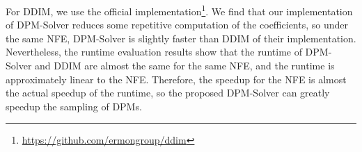 For DDIM, we use the official implementation\footnote{\url{https://github.com/ermongroup/ddim}}. We find that our implementation of DPM-Solver reduces some repetitive computation of the coefficients, so under the same NFE, DPM-Solver is slightly faster than DDIM of their implementation. Nevertheless, the runtime evaluation results show that the runtime of DPM-Solver and DDIM are almost the same for the same NFE, and the runtime is approximately linear to the NFE. Therefore, the speedup for the NFE is almost the actual speedup of the runtime, so the proposed DPM-Solver can greatly speedup the sampling of DPMs.


\begin{table}[t]
    \centering
    \caption{\small{Runtime of a single batch (second / batch, $\pm$std) on a single NVIDIA A40 of DDIM and DPM-Solver for sampling by discrete-time diffusion models, varying the number of function evaluations (NFE).}}
    \label{tab:runtime}
\end{table}
